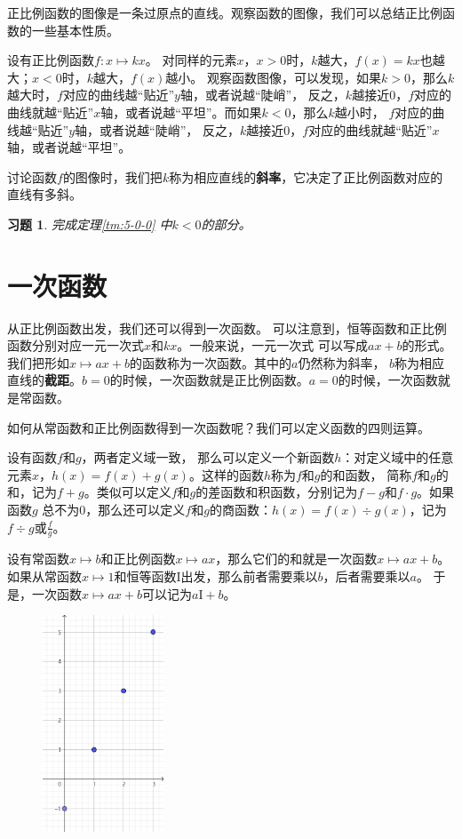 \documentclass[12pt,UTF8]{ctexbook}
\newtheorem{xt}{习题}[section]
\begin{document}
正比例函数的图像是一条过原点的直线。观察函数的图像，我们可以总结正比例函数的一些基本性质。

设有正比例函数$f: x\mapsto kx$。
对同样的元素$x$，$x>0$时，$k$越大，$f(x) = kx$也越大；$x<0$时，$k$越大，$f(x)$越小。
观察函数图像，可以发现，如果$k>0$，那么$k$越大时，$f$对应的曲线越“贴近”$y$轴，或者说越“陡峭”，
反之，$k$越接近$0$，$f$对应的曲线就越“贴近”$x$轴，或者说越“平坦”。而如果$k<0$，那么$k$越小时，
$f$对应的曲线越“贴近”$y$轴，或者说越“陡峭”，
反之，$k$越接近$0$，$f$对应的曲线就越“贴近”$x$轴，或者说越“平坦”。

讨论函数$f$的图像时，我们把$k$称为相应直线的\textbf{斜率}，它决定了正比例函数对应的直线有多斜。

\begin{xt}\label{xt:5-0-0}
    完成定理\ref{tm:5-0-0} 中$k<0$的部分。
\end{xt}

\section{一次函数}
从正比例函数出发，我们还可以得到一次函数。
可以注意到，恒等函数和正比例函数分别对应一元一次式$x$和$kx$。一般来说，一元一次式
可以写成$ax+b$的形式。我们把形如$x \mapsto ax + b$的函数称为一次函数。其中的$a$仍然称为斜率，
$b$称为相应直线的\textbf{截距}。$b=0$的时候，一次函数就是正比例函数。$a=0$的时候，一次函数就是常函数。

如何从常函数和正比例函数得到一次函数呢？我们可以定义函数的四则运算。

设有函数$f$和$g$，两者定义域一致，
那么可以定义一个新函数$h$：对定义域中的任意元素$x$，$h(x) = f(x) + g(x)$。这样的函数$h$称为$f$和$g$的和函数，
简称$f$和$g$的和，记为$f + g$。类似可以定义$f$和$g$的差函数和积函数，分别记为$f - g$和$f\cdot g$。如果函数$g$
总不为$0$，那么还可以定义$f$和$g$的商函数：$h(x) = f(x) \div g(x)$，记为$f \div g$或$\frac{f}{g}$。

设有常函数$x\mapsto b$和正比例函数$x\mapsto ax$，那么它们的和就是一次函数$x\mapsto ax + b$。
如果从常函数$x\mapsto 1$和恒等函数$\mathrm{I}$出发，那么前者需要乘以$b$，后者需要乘以$a$。
于是，一次函数$x \mapsto ax + b$可以记为$a\mathrm{I} +b$。

\begin{figure} %
    \vspace{-10pt}
    \flushright
    \includegraphics[width=0.32\textwidth]{tu/一次函数1.png}
\end{figure}
\end{document}
